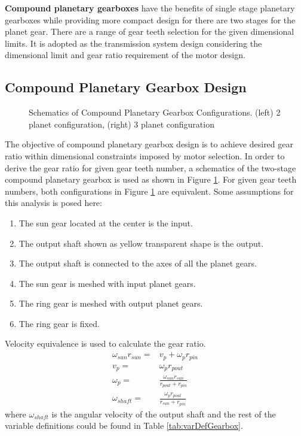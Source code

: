 \textbf{Compound planetary gearboxes} have the benefits of single stage planetary gearboxes while providing more compact design for there are two stages for the planet gear. There are a range of gear teeth selection for the given dimensional limits. It is adopted as the transmission system design considering the dimensional limit and gear ratio requirement of the motor design.

\subsection{Compound Planetary Gearbox Design}
\label{sec:compoundGearBox}

\begin{figure}
	\centering
	\caption{Schematics of Compound Planetary Gearbox Configurations. (left) 2 planet configuration, (right) 3 planet configuration}
	\label{fig:planetaryGearbox}
\end{figure}

The objective of compound planetary gearbox design is to achieve desired gear ratio within dimensional constraints imposed by motor selection. In order to derive the gear ratio for given gear teeth number, a schematics of the two-stage compound planetary gearbox is used as shown in Figure \ref{fig:planetaryGearbox}. For given gear teeth numbers, both configurations in Figure \ref{fig:planetaryGearbox} are equivalent. Some assumptions for this analysis is posed here: 

\begin{enumerate}
	\item The sun gear located at the center is the input.
	\item The output shaft shown as yellow transparent shape is the output.
	\item The output shaft is connected to the axes of all the planet gears.
	\item The sun gear is meshed with input planet gears.
	\item The ring gear is meshed with output planet gears.
	\item The ring gear is fixed.
\end{enumerate}

Velocity equivalence is used to calculate the gear ratio.
\begin{eqnarray}
\omega_{sun} r_{sun} =& v_p + \omega_p r_{pin}\\
v_p =& \omega_{p} r_{pout}\\
\omega_p =& \frac{\omega_{sun}r_{sun}}{r_{pout}+r_{pin}}\\
\omega_{shaft} =& \frac{\omega_{p}r_{pout}}{r_{sun}+r_{pin}}
\end{eqnarray}
where $\omega_{shaft}$ is the angular velocity of the output shaft and the rest of the variable definitions could be found in Table \ref{tab:varDefGearbox}.

